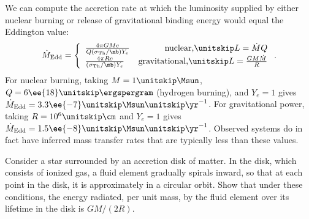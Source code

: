 We can compute the accretion rate at which the luminosity supplied by either nuclear burning or release of gravitational binding energy would equal the Eddington value:
\[
\dot{M}_{\mathrm{Edd}} = \left\{\begin{array}{lr}
	\frac{4\pi GM c}{Q(\sigma_{\mathrm{Th}}/\mb)Y_{e}}  & \textrm{nuclear,}\nsp L = \dot{M}Q \\
	\frac{4\pi R c}{(\sigma_{\mathrm{Th}}/\mb)Y_{e}} & \textrm{gravitational,}\nsp L= \frac{GM\dot{M}}{R}
\end{array}\right. .
\]
For nuclear burning, taking $M = 1\nsp\Msun$, $Q = 6\ee{18}\nsp\ergspergram$ (hydrogen burning), and $Y_{e} = 1$ gives $\dot{M}_{\mathrm{Edd}} = 3.3\ee{-7}\nsp\Msun\usp\yr^{-1}$.  For gravitational power, taking $R = 10^{6}\nsp\cm$ and $Y_{e} = 1$ gives $\dot{M}_{\mathrm{Edd}} = 1.5\ee{-8}\nsp\Msun\usp\yr^{-1}$.  Observed systems do in fact have inferred mass transfer rates that are typically less than these values.

\begin{exercisebox}
\label{p.disk-L} Consider a star surrounded by an accretion disk of matter.  In the disk, which consists of ionized gas, a fluid element gradually spirals inward, so that at each point in the disk, it is approximately in a circular orbit.  Show that under these conditions, the energy radiated, per unit mass, by the fluid element over its lifetime in the disk is $GM/(2R)$.
\end{exercisebox}
